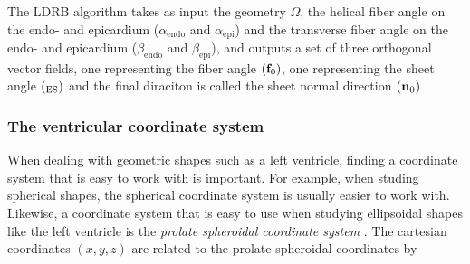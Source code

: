 The LDRB algorithm takes as
input the geometry $\Omega$, the helical fiber angle on the endo- and
epicardium ($\alpha_{\mathrm{endo}}$ and $\alpha_{\mathrm{epi}}$) and
the transverse fiber angle on the endo- and epicardium
($\beta_{\mathrm{endo}}$ and $\beta_{\mathrm{epi}}$), and outputs a
set of three orthogonal vector fields, one representing the fiber
angle $(\mathbf{f}_0)$, one representing the sheet angle $(_{\text{ES}})$ and the final
diraciton is called the sheet normal direction $(\mathbf{n}_0)$

\subsubsection{The ventricular coordinate system}

When dealing with geometric shapes such as a left ventricle, finding a
coordinate system that is easy to work with is important. For
example, when studing spherical shapes, the spherical coordinate system is
usually easier to work with. Likewise, a coordinate system that is
easy to use when studying ellipsoidal shapes like the left ventricle is
the \emph{prolate spheroidal coordinate system} \cite{hunter1996kd}. 
The cartesian coordinates $(x,y,z)$ are related to the prolate
spheroidal coordinates by

